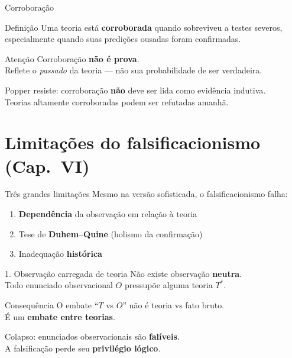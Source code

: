 \documentclass[aspectratio=169]{beamer}
\newcommand{\impt}[1]{\textcolor{maccent}{\textbf{#1}}}
\newcommand{\ntc}[1]{\textcolor{mprimary}{#1}}
\begin{document}
\begin{frame}{Corroboração}
\begin{block}{Definição}
Uma teoria está \impt{corroborada} quando sobreviveu a testes severos, especialmente quando suas predições ousadas foram confirmadas.
\end{block}
\pause
\vspace{0.5cm}
\begin{alertblock}{Atenção}
Corroboração \impt{não é prova}. \\
Reflete o \emph{passado} da teoria --- não sua probabilidade de ser verdadeira.
\end{alertblock}
\pause
\vspace{0.4cm}
\ntc{Popper resiste:} corroboração \impt{não} deve ser lida como evidência indutiva. \\
Teorias altamente corroboradas podem ser refutadas amanhã.
\end{frame}
\section{Limitações do falsificacionismo (Cap.~VI)}

\begin{frame}{Três grandes limitações}
Mesmo na versão sofisticada, o falsificacionismo falha:
\vspace{0.4cm}
\pause
\begin{enumerate}
  \item \impt{Dependência} da observação em relação à teoria
  \pause
  \vspace{0.2cm}
  \item Tese de \impt{Duhem--Quine} (holismo da confirmação)
  \pause
  \vspace{0.2cm}
  \item Inadequação \impt{histórica}
\end{enumerate}
\end{frame}

\begin{frame}{1. Observação carregada de teoria}
Não existe observação \impt{neutra}. \\
Todo enunciado observacional $O$ pressupõe alguma teoria $T^*$.
\vspace{0.5cm}
\pause
\begin{block}{Consequência}
O embate ``$T$ vs $O$'' não é teoria vs fato bruto. \\
É um \impt{embate entre teorias}.
\end{block}
\pause
\vspace{0.4cm}
\ntc{Colapso:} enunciados observacionais são \impt{falíveis}. \\
A falsificação perde seu \impt{privilégio lógico}.
\end{frame}
\end{document}
